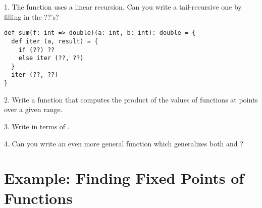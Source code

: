 \documentclass[11pt]{book}
\begin{document}
1. The \verb@sum@ function uses a linear recursion. Can you write a
tail-recursive one by filling in the ??'s?

\begin{verbatim}
def sum(f: int => double)(a: int, b: int): double = {
  def iter (a, result) = {
    if (??) ??
    else iter (??, ??)
  }
  iter (??, ??)
}
\end{verbatim}

2. Write a function \verb@product@ that computes the product of the
values of functions at points over a given range.

3. Write \verb@factorial@ in terms of \verb@product@.

4. Can you write an even more general function which generalizes both
\verb@sum@ and \verb@product@?

\section{Example: Finding Fixed Points of Functions}
\end{document}

